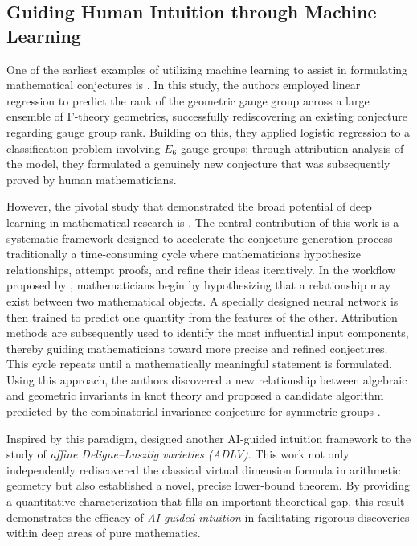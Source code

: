 \documentclass[11pt]{article}
\numberwithin{equation}{section}
\begin{document}
\subsection{Guiding Human Intuition through Machine Learning}

One of the earliest examples of utilizing machine learning to assist in formulating mathematical conjectures is \cite{carifio2017machine}. In this study, the authors employed linear regression to predict the rank of the geometric gauge group across a large ensemble of F-theory geometries, successfully rediscovering an existing conjecture regarding gauge group rank. Building on this, they applied logistic regression to a classification problem involving $E_6$ gauge groups; through attribution analysis of the model, they formulated a genuinely new conjecture that was subsequently proved by human mathematicians.

However, the pivotal study that demonstrated the broad potential of deep learning in mathematical research is \cite{davies2021advancing}. The central contribution of this work is a systematic framework designed to accelerate the conjecture generation process—traditionally a time-consuming cycle where mathematicians hypothesize relationships, attempt proofs, and refine their ideas iteratively. In the workflow proposed by \cite{davies2021advancing}, mathematicians begin by hypothesizing that a relationship may exist between two mathematical objects. A specially designed neural network is then trained to predict one quantity from the features of the other. Attribution methods are subsequently used to identify the most influential input components, thereby guiding mathematicians toward more precise and refined conjectures. This cycle repeats until a mathematically meaningful statement is formulated. Using this approach, the authors discovered a new relationship between algebraic and geometric invariants in knot theory \cite{davies2024signature} and proposed a candidate algorithm predicted by the combinatorial invariance conjecture for symmetric groups \cite{blundell2022towards}.

Inspired by this paradigm, \cite{dong2024machine} designed another AI-guided intuition framework to the study of \textit{affine Deligne--Lusztig varieties (ADLV)}. This work not only independently rediscovered the classical virtual dimension formula in arithmetic geometry but also established a novel, precise lower-bound theorem. By providing a quantitative characterization that fills an important theoretical gap, this result demonstrates the efficacy of \textit{AI-guided intuition} in facilitating rigorous discoveries within deep areas of pure mathematics.
\end{document}
